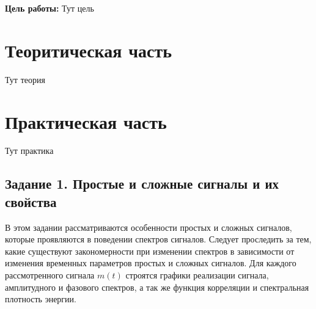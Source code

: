 



\def\labauthors{Понур К.А., Хавьер, Шиков А.П.}
\def\labgroup{450}
\def\labnumber{1}
\def\labtheme{Согласованные фильтры}


\newpage

{\bfseries Цель работы:} 
Тут цель

\section{Теоритическая часть}

Тут теория


\newpage
\section{Практическая часть}
Тут практика

\subsection{Задание 1. Простые и сложные сигналы и их свойства}
В этом задании рассматриваются особенности простых и сложных
сигналов, которые проявляются в поведении спектров сигналов. Следует
проследить за тем, какие существуют закономерности при изменении спектров
в зависимости от изменения временных параметров простых и сложных
сигналов.
Для каждого рассмотренного сигнала $m(t)$ строятся графики реализации
сигнала, амплитудного и фазового спектров, а так же функция корреляции и
спектральная плотность энергии.


